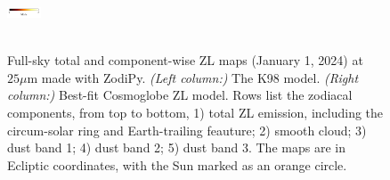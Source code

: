 \documentclass[twocolumn]{aa}
\begin{document}
\begin{figure}
{    \includegraphics[width=1cm,angle=90]{figs/comp_maps/cbar_2_inst.pdf}%
    }\\
    \\
    \caption{Full-sky total and component-wise ZL maps (January 1, 2024) at $25\mu$m made with ZodiPy. 
    \textit{(Left column:)} The K98 model. \textit{(Right column:)} Best-fit Cosmoglobe ZL model. 
    Rows list the zodiacal components, from top to bottom, 1) total ZL emission, including the 
    circum-solar ring and Earth-trailing feauture; 2) smooth cloud; 3) dust band 1; 4) 
    dust band 2; 5) dust band 3. The maps are in Ecliptic coordinates, with the Sun marked as 
    an orange circle.}
    \label{fig:mission-averaged-inst-maps}
\end{figure}
\end{document}
